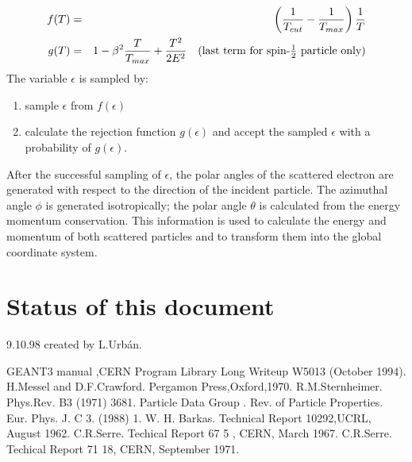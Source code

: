 \begin{eqnarray*}
f(T) &=& \left(\frac{1}{T_{cut}} -\frac{1}{T_{max}}\right)
\frac{1}{T} \\
g(T) &=& 1 - \beta^2\frac{T}{T_{max}} +\frac{T^2}{2E^2}
\mbox{\quad(last term for spin-$\frac{1}{2}$ particle only)}
\end{eqnarray*}
The variable $\epsilon$ is sampled by:
\begin{enumerate}
\item sample $\epsilon$ from $f(\epsilon)$
\item calculate the rejection function $g(\epsilon)$ and accept the
sampled $\epsilon$ with a probability of $g(\epsilon)$.
\end{enumerate}

After the successful sampling of $\epsilon$,  the polar
angles of the scattered electron are generated 
with respect to the direction of the
incident particle. The azimuthal angle $\phi$ is generated isotropically;
the polar angle
$\theta$ is calculated from the energy momentum conservation.
This information
is used to calculate the energy and momentum of both scattered
particles and to transform them into the global coordinate system.

\section{Status of this document}

  9.10.98  created by L.Urb\'an.

\begin{thebibliography}{99}

  GEANT3 manual ,CERN Program Library Long Writeup W5013 (October 1994).
  H.Messel and D.F.Crawford. Pergamon Press,Oxford,1970.
  R.M.Sternheimer. Phys.Rev. B3 (1971) 3681.
  Particle Data Group . Rev. of Particle Properties.
   Eur. Phys. J. C 3. (1988) 1.
  W. H. Barkas. Technical Report 10292,UCRL, August 1962.
  C.R.Serre. Techical Report 67 5 , CERN, March 1967.
  C.R.Serre. Techical Report 71 18, CERN, September 1971.

\end{thebibliography}

